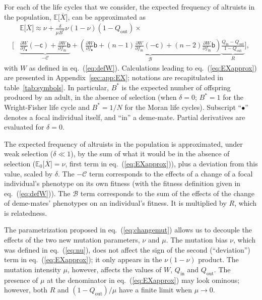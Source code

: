\documentclass[11pt, letterpaper]{article}
\renewcommand{\eqref}[1]{\textup{{\normalfont eq.~(\ref{#1}}\normalfont)}}
\newcommand{\derivn}[2]{\frac{\partial #1}{\partial #2}}
\newcommand{\Esp}[1]{\mathbb{E}\big[ #1\big]}%
\newcommand{\Espzero}[1]{\mathbb{E}_0\big[ #1\big]}%
\newcommand{\appname}[0]{Appendix}
\newcommand{\bb}{\mathsf{b}}
\newcommand{\cc}{\mathsf{c}}
\newcommand{\mutbias}{\nu}
\newcommand{\inn}{\textrm{in}}
\newcommand{\out}{\textrm{out}}
\newcommand{\focal}{\bullet}
\newcommand{\Qin}{Q_{\inn}}
\newcommand{\Qout}{Q_{\out}}
\newcommand{\selstr}{\delta}
\begin{document}
For each of the life cycles that we consider, the expected frequency of altruists in the population, $\Esp{\overline{X}}$, can be approximated as
\begin{equation}\label{eq:EXapprox}
\begin{split}
& \Esp{\overline{X}} \approx \mutbias + 
\frac{\selstr}{\mu B^*}  \mutbias (1-\mutbias) (1 - Q_{\out}) \times \\
 \Bigg[ &\underbrace{ \derivn{W}{f_{\focal}} (-\cc) + \derivn{W}{f_{\inn}} \bb}_{-\mathcal{C}} + \underbrace{ \left( \derivn{W}{f_{\focal}} \bb + (n-1) \derivn{W}{f_{\inn}} (-\cc) + (n-2) \derivn{W}{f_{\inn}} \bb \right) }_{\mathcal{B}} \underbrace{\frac{Q_{\inn} - Q_{\out}}{1 - Q_{\out}}}_{R} \Bigg],
\end{split}
\end{equation}
%
with $W$ as defined in \eqref{eq:defW}. Calculations leading to \eqref{eq:EXapprox} are presented in  \appname~\ref{sec:app:EX}; notations are recapitulated in table~\ref{tab:symbols}. In particular, $B^*$ is the expected number of offspring produced by an adult, in the absence of selection (when $\selstr=0$; $B^*=1$ for the Wright-Fisher life cycle and $B^*=1/N$ for the Moran life cycles). Subscript ``$\focal$'' denotes a focal individual itself, and ``$\inn$'' a deme-mate. Partial derivatives are evaluated for $\selstr=0$.

The expected frequency of altruists in the population is approximated, under weak selection ($\selstr \ll 1$), by the sum of what it would be in the absence of selection ($\Espzero{\overline{X}} =\mutbias$, first term in \eqref{eq:EXapprox}), plus a deviation from this value, scaled by $\selstr$. The $-\mathcal{C}$ term corresponds to the effects of a change of a focal individual's phenotype on its own fitness (with the fitness definition given in \eqref{eq:defW}). The $\mathcal{B}$ term corresponds to the sum of the effects of the change of deme-mates' phenotypes on an individual's fitness. It is multiplied by $R$, which is relatedness. 

The parametrization proposed in \eqref{eq:changemut} allows us to decouple the effects of the two new mutation parameters, $\mutbias$ and $\mu$. The mutation bias $\mutbias$, which was defined in \eqref{eq:nu}, does not affect the sign of the second (``deviation'') term in \eqref{eq:EXapprox}; it only appears in the $\mutbias (1-\mutbias)$ product. The mutation intensity $\mu$, however, affects the values of $W$, $\Qin$ and $\Qout$. The presence of $\mu$ at the denominator in \eqref{eq:EXapprox} may look ominous; however, both $R$ and $(1-\Qout)/\mu$ have a finite limit when $\mu \to 0$. 
\end{document}

